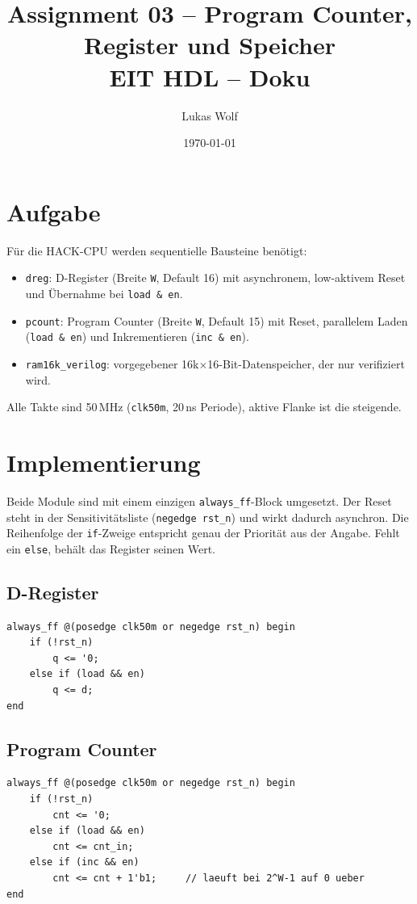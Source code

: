 \documentclass[11pt,a4paper]{article}
\title{Assignment 03 -- Program Counter, Register und Speicher\\\large EIT HDL -- Doku}
\author{Lukas Wolf}
\date{\today}
\begin{document}
\maketitle

\section{Aufgabe}
Für die HACK-CPU werden sequentielle Bausteine benötigt:
\begin{itemize}
  \item \texttt{dreg}: D-Register (Breite \texttt{W}, Default 16) mit asynchronem,
        low-aktivem Reset und Übernahme bei \texttt{load \& en}.
  \item \texttt{pcount}: Program Counter (Breite \texttt{W}, Default 15) mit Reset, parallelem
        Laden (\texttt{load \& en}) und Inkrementieren (\texttt{inc \& en}).
  \item \texttt{ram16k\_verilog}: vorgegebener 16k$\times$16-Bit-Datenspeicher, der nur verifiziert wird.
\end{itemize}
Alle Takte sind 50\,MHz (\texttt{clk50m}, 20\,ns Periode), aktive Flanke ist die steigende.

\section{Implementierung}
Beide Module sind mit einem einzigen \texttt{always\_ff}-Block umgesetzt. Der Reset steht in
der Sensitivitätsliste (\texttt{negedge rst\_n}) und wirkt dadurch asynchron. Die Reihenfolge
der \texttt{if}-Zweige entspricht genau der Priorität aus der Angabe. Fehlt ein \texttt{else},
behält das Register seinen Wert.

\subsection*{D-Register}
\begin{lstlisting}[language=SV]
always_ff @(posedge clk50m or negedge rst_n) begin
    if (!rst_n)
        q <= '0;
    else if (load && en)
        q <= d;
end
\end{lstlisting}

\subsection*{Program Counter}
\begin{lstlisting}[language=SV]
always_ff @(posedge clk50m or negedge rst_n) begin
    if (!rst_n)
        cnt <= '0;
    else if (load && en)
        cnt <= cnt_in;
    else if (inc && en)
        cnt <= cnt + 1'b1;     // laeuft bei 2^W-1 auf 0 ueber
end
\end{lstlisting}
\end{document}
